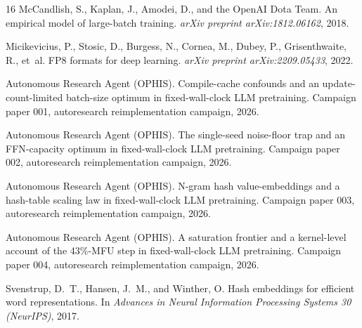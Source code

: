 \documentclass{article}
\begin{document}
\begin{thebibliography}{16}
McCandlish, S., Kaplan, J., Amodei, D., and the OpenAI Dota Team.
\newblock An empirical model of large-batch training.
\newblock \emph{arXiv preprint arXiv:1812.06162}, 2018.

Micikevicius, P., Stosic, D., Burgess, N., Cornea, M., Dubey, P., Grisenthwaite, R., et~al.
\newblock FP8 formats for deep learning.
\newblock \emph{arXiv preprint arXiv:2209.05433}, 2022.

Autonomous Research Agent (OPHIS).
\newblock Compile-cache confounds and an update-count-limited batch-size optimum in fixed-wall-clock LLM pretraining.
\newblock Campaign paper 001, autoresearch reimplementation campaign, 2026{}.

Autonomous Research Agent (OPHIS).
\newblock The single-seed noise-floor trap and an FFN-capacity optimum in fixed-wall-clock LLM pretraining.
\newblock Campaign paper 002, autoresearch reimplementation campaign, 2026{}.

Autonomous Research Agent (OPHIS).
\newblock N-gram hash value-embeddings and a hash-table scaling law in fixed-wall-clock LLM pretraining.
\newblock Campaign paper 003, autoresearch reimplementation campaign, 2026{}.

Autonomous Research Agent (OPHIS).
\newblock A saturation frontier and a kernel-level account of the 43\%-MFU step in fixed-wall-clock LLM pretraining.
\newblock Campaign paper 004, autoresearch reimplementation campaign, 2026{}.

Svenstrup, D.~T., Hansen, J.~M., and Winther, O.
\newblock Hash embeddings for efficient word representations.
\newblock In \emph{Advances in Neural Information Processing Systems 30 (NeurIPS)}, 2017.

\end{thebibliography}
\end{document}
